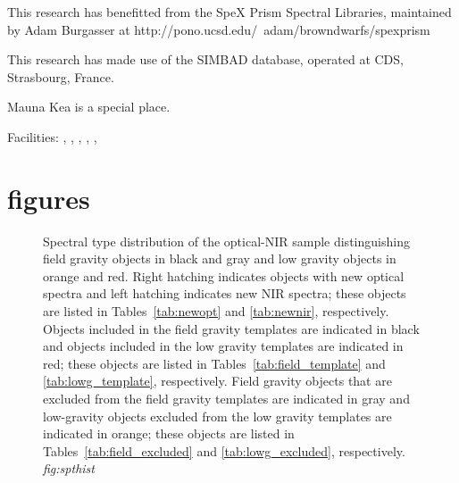 \documentclass[12pt,preprint]{aastex}
\begin{document}
This research has benefitted from the SpeX Prism Spectral Libraries, maintained by Adam Burgasser at http://pono.ucsd.edu/~adam/browndwarfs/spexprism

This research has made use of the SIMBAD database, operated at CDS, Strasbourg, France.

Mauna Kea is a special place.

Facilities: 
, 
,
, 
,
, 
                                     

%


\clearpage 
\section{figures}

\begin{figure}
		\caption{Spectral type distribution of the optical-NIR sample distinguishing field gravity objects in black and gray and low gravity objects in orange and red.	 
		Right hatching indicates objects with new optical spectra and left hatching indicates new NIR spectra; these objects are listed in Tables~\ref{tab:newopt} and \ref{tab:newnir}, respectively.
		Objects included in the field gravity templates are indicated in black and objects included in the low gravity templates are indicated in red; these objects are listed in Tables~\ref{tab:field_template} and \ref{tab:lowg_template}, respectively.
		Field gravity objects that are excluded from the field gravity templates are indicated in gray and low-gravity objects excluded from the low gravity templates are indicated in orange; these objects are listed in Tables~\ref{tab:field_excluded} and \ref{tab:lowg_excluded}, respectively.\\
		\emph{fig:spthist}
		}
	\label{fig:spthist}
\end{figure}
\end{document}
